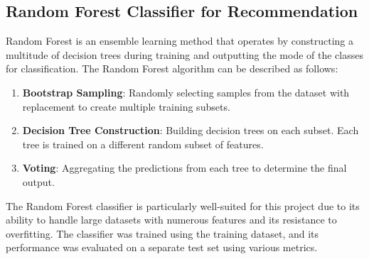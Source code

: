\documentclass[sigconf]{acmart}
\begin{document}
	\subsection{Random Forest Classifier for Recommendation}
	Random Forest is an ensemble learning method that operates by constructing a multitude of decision trees during training and outputting the mode of the classes for classification. The Random Forest algorithm can be described as follows:
	\begin{enumerate}
		\item \textbf{Bootstrap Sampling}: Randomly selecting samples from the dataset with replacement to create multiple training subsets.
		\item \textbf{Decision Tree Construction}: Building decision trees on each subset. Each tree is trained on a different random subset of features.
		\item \textbf{Voting}: Aggregating the predictions from each tree to determine the final output.
	\end{enumerate}
	The Random Forest classifier is particularly well-suited for this project due to its ability to handle large datasets with numerous features and its resistance to overfitting. The classifier was trained using the training dataset, and its performance was evaluated on a separate test set using various metrics.
\end{document}
